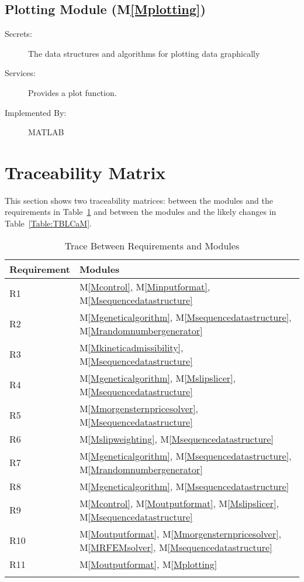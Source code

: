 \documentclass[12pt]{article}
\begin{document}
\subsection{Plotting Module (M\ref{Mplotting})}
\label{Sec:PM()}
\begin{description}
\item[Secrets:]The data structures and algorithms for plotting data graphically
\item[Services:]Provides a plot function.
\item[Implemented By:]MATLAB
\end{description}
\section{Traceability Matrix}
\label{Sec:TM}
This section shows two traceability matrices: between the modules and the requirements in Table~\ref{Table:TBRaM} and between the modules and the likely changes in Table~\ref{Table:TBLCaM}.
\begin{longtable}{l l}
\toprule
Requirement & Modules
\\
\midrule
R1 & M\ref{Mcontrol}, M\ref{Minputformat}, M\ref{Msequencedatastructure}
\\
R2 & M\ref{Mgeneticalgorithm}, M\ref{Msequencedatastructure}, M\ref{Mrandomnumbergenerator}
\\
R3 & M\ref{Mkineticadmissibility}, M\ref{Msequencedatastructure}
\\
R4 & M\ref{Mgeneticalgorithm}, M\ref{Mslipslicer}, M\ref{Msequencedatastructure}
\\
R5 & M\ref{Mmorgensternpricesolver}, M\ref{Msequencedatastructure}
\\
R6 & M\ref{Mslipweighting}, M\ref{Msequencedatastructure}
\\
R7 & M\ref{Mgeneticalgorithm}, M\ref{Msequencedatastructure}, M\ref{Mrandomnumbergenerator}
\\
R8 & M\ref{Mgeneticalgorithm}, M\ref{Msequencedatastructure}
\\
R9 & M\ref{Mcontrol}, M\ref{Moutputformat}, M\ref{Mslipslicer}, M\ref{Msequencedatastructure}
\\
R10 & M\ref{Moutputformat}, M\ref{Mmorgensternpricesolver}, M\ref{MRFEMsolver}, M\ref{Msequencedatastructure}
\\
R11 & M\ref{Moutputformat}, M\ref{Mplotting}
\\
\bottomrule
\caption{Trace Between Requirements and Modules}
\label{Table:TBRaM}
\end{longtable}
\end{document}
